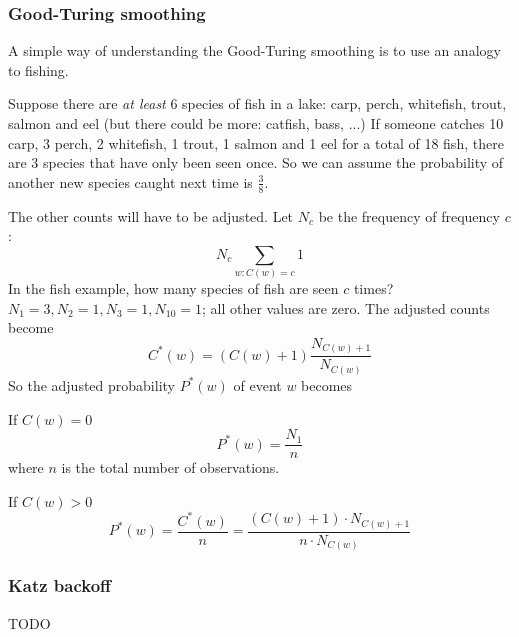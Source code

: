 \documentclass[Report.tex]{subfiles}
\begin{document}
\subsubsection{Good-Turing smoothing}
A simple way of understanding the Good-Turing smoothing is to use an analogy
to fishing.

Suppose there are \textit{at least} 6 species of fish in a lake:
carp, perch, whitefish, trout, salmon and eel (but there could be more:
catfish, bass, ...) If someone catches 10 carp, 3 perch, 2 whitefish,
1 trout, 1 salmon and 1 eel for a total of 18 fish, there are 3 species
that have only been seen once. So we can assume the probability of another
new species caught next time is $\frac{3}{8}$.

The other counts will have to be adjusted. Let $N_c$ be the frequency of
frequency $c$:
\begin{equation}
N_c \sum_{w:C(w) = c} 1
\end{equation}
In the fish example, how many species of fish are seen $c$ times?
$N_1 = 3, N_2 = 1, N_3 = 1, N_10 = 1$; all other values are zero.
The adjusted counts become
\begin{equation}
C^{*}(w) = (C(w) + 1)\frac{N_{C(w) + 1}}{N_{C(w)}}
\end{equation}
So the adjusted probability $P^{*}(w)$ of event $w$ becomes

If $C(w) = 0$
\begin{equation}
P^{*}(w) = \frac{N_1}{n}
\end{equation}
where $n$ is the total number of observations.

If $C(w) > 0$
\begin{equation}
P^{*}(w) = \frac{C^{*}(w)}{n} = \frac{(C(w) + 1) \cdot N_{C(w) + 1}}{n \cdot N_{C(w)}}
\end{equation}

\subsubsection{Katz backoff}
TODO
\end{document}
